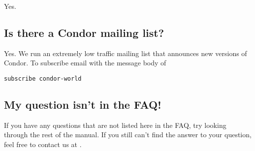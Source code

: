 Yes.

\subsection{Is there a Condor mailing list?}

Yes.  We run an extremely low traffic mailing list that announces new versions of Condor.
To subscribe email
with the message body of
\begin{verbatim}
subscribe condor-world
\end{verbatim}

\subsection{My question isn't in the FAQ!}

If you have any questions that are not listed here in the FAQ, try
looking through the rest of the manual.
If you still can't find the answer to your question, feel free to
contact us at .
